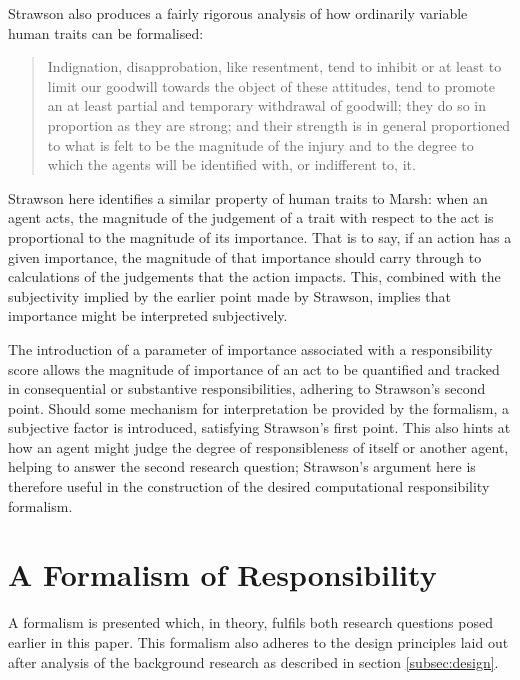 Strawson also produces a fairly rigorous analysis of how ordinarily variable human traits can be formalised:

\begin{quotation}
    Indignation, disapprobation, like resentment, tend to inhibit or at least to limit our goodwill towards the object of these attitudes, tend to promote an at least partial and temporary withdrawal of goodwill; they do so in proportion as they are strong; and their strength is in general proportioned to what is felt to be the magnitude of the injury and to the degree to which the agents will be identified with, or indifferent to, it.\cite{strawson}
\end{quotation}

Strawson here identifies a similar property of human traits to Marsh: when an agent acts, the magnitude of the judgement of a trait with respect to the act is proportional to the magnitude of its importance. That is to say, if an action has a given importance, the magnitude of that importance should carry through to calculations of the judgements that the action impacts. This, combined with the subjectivity implied by the earlier point made by Strawson, implies that importance might be interpreted subjectively.\par

The introduction of a parameter of importance associated with a responsibility score allows the magnitude of importance of an act to be quantified and tracked in consequential or substantive responsibilities, adhering to Strawson's second point. Should some mechanism for interpretation be provided by the formalism, a subjective factor is introduced, satisfying Strawson's first point. This also hints at how an agent might judge the degree of responsibleness of itself or another agent, helping to answer the second research question; Strawson's argument here is therefore useful in the construction of the desired computational responsibility formalism.\par



\section{A Formalism of Responsibility}\label{sec:formalism_details}
A formalism is presented which, in theory, fulfils both research questions posed earlier in this paper. This formalism also adheres to the design principles laid out after analysis of the background research as described in section \ref{subsec:design}.\par

